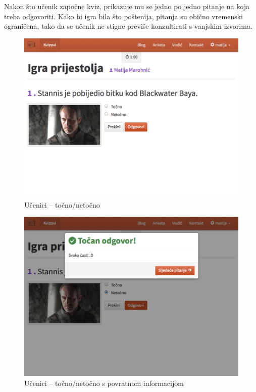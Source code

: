 \documentclass{scrreprt}
\begin{document}
Nakon što učenik započne kviz, prikazuje mu se jedno po jedno pitanje na koja
treba odgovoriti. Kako bi igra bila što poštenija, pitanja su obično vremenski
ograničena, tako da se učenik ne stigne previše konzultirati s vanjskim
izvorima.

\begin{figure}[H]
  \includegraphics[width=\textwidth, clip=true, trim=0 7cm 0 0, fbox]{student/boolean_question}
  \caption{Učenici -- točno/netočno}
\end{figure}

\begin{figure}[H]
  \includegraphics[width=\textwidth, clip=true, trim=0 7cm 0 0, fbox]{student/boolean_question_correct}
  \caption{Učenici -- točno/netočno s povratnom informacijom}
\end{figure}
\end{document}
